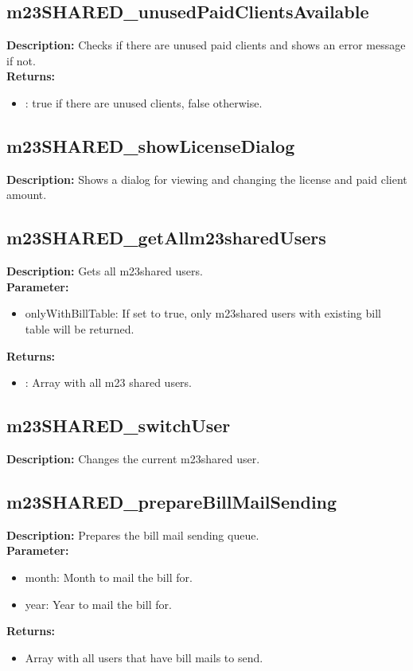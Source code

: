 \subsection{m23SHARED\_unusedPaidClientsAvailable}
\textbf{Description:} Checks if there are unused paid clients and shows an error message if not.\\
\textbf{Returns:}
\begin{itemize}
\item : true if there are unused clients, false otherwise.
\end{itemize}

\subsection{m23SHARED\_showLicenseDialog}
\textbf{Description:} Shows a dialog for viewing and changing the license and paid client amount.\\

\subsection{m23SHARED\_getAllm23sharedUsers}
\textbf{Description:} Gets all m23shared users.\\
\textbf{Parameter:}
\begin{itemize}
\item onlyWithBillTable: If set to true, only m23shared users with existing bill table will be returned.
\end{itemize}
\textbf{Returns:}
\begin{itemize}
\item : Array with all m23 shared users.
\end{itemize}

\subsection{m23SHARED\_switchUser}
\textbf{Description:} Changes the current m23shared user.\\

\subsection{m23SHARED\_prepareBillMailSending}
\textbf{Description:} Prepares the bill mail sending queue.\\
\textbf{Parameter:}
\begin{itemize}
\item month: Month to mail the bill for.
\item year: Year to mail the bill for.
\end{itemize}
\textbf{Returns:}
\begin{itemize}
\item Array with all users that have bill mails to send.
\end{itemize}

